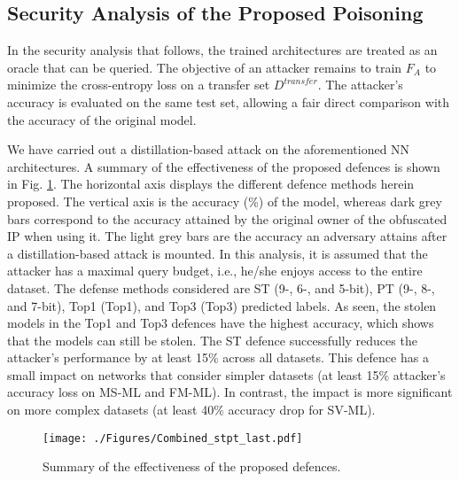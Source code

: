 \documentclass[10pt, twocolumn, conference]{IEEEtran}
\begin{document}

\subsection{Security Analysis of the Proposed Poisoning} \label{rslt}

In the security analysis that follows, the trained architectures are treated as an oracle that can be queried. The objective of an attacker remains to train $F_A$ to minimize the cross-entropy loss on a transfer set $D^{transfer}$. The attacker's accuracy is evaluated on the same test set, allowing a fair direct comparison with the accuracy of the original model. %

We have carried out a distillation-based attack on the aforementioned NN architectures. A summary of the effectiveness of the proposed defences is shown in Fig. \ref{oldplot}. The horizontal axis displays the different defence methods herein proposed. The vertical axis is the accuracy (\%) of the model, whereas dark grey bars correspond to the accuracy attained by the original owner of the obfuscated IP when using it. The light grey bars are the accuracy an adversary attains after a distillation-based attack is mounted. In this analysis, it is assumed that the attacker has a maximal query budget, i.e., he/she enjoys access to the entire dataset. The defense methods considered are ST (9-, 6-, and 5-bit), PT (9-, 8-, and 7-bit), Top1 (Top1), and Top3 (Top3) predicted labels. As seen, the stolen models in the Top1 and Top3 defences have the highest accuracy, which shows that the models can still be stolen. The ST defence successfully reduces the attacker's performance by at least 15\% across all datasets. This defence has a small impact on networks that consider simpler datasets (at least 15\% attacker's accuracy loss on MS-ML and FM-ML). In contrast, the impact is more significant on more complex datasets (at least 40\% accuracy drop for SV-ML). 


\begin{figure}[t]
\centering
{\texttt{[image: ./Figures/Combined\_stpt\_last.pdf]}}\vspace{-10pt}
\caption{Summary of the effectiveness of the proposed defences.}\vspace{-10pt}
\label{oldplot}
\end{figure}
\end{document}
